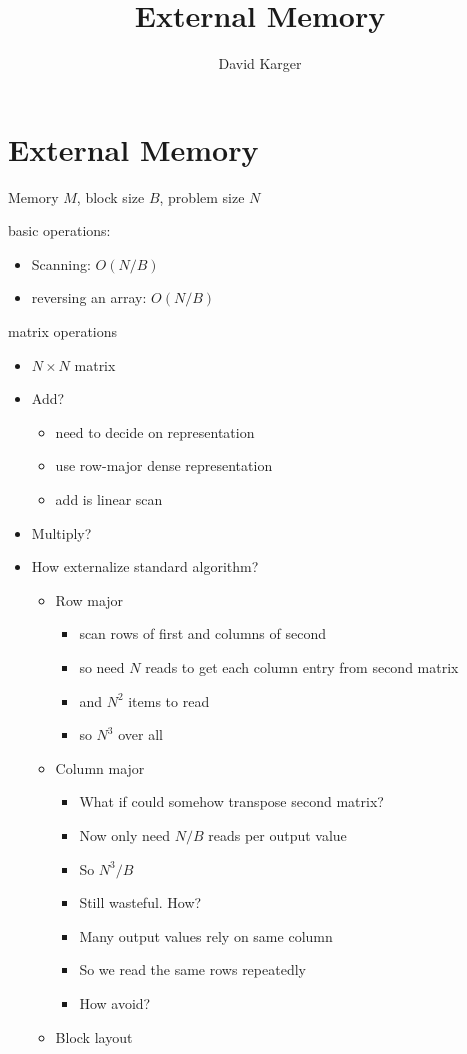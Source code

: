 \documentclass{article}
\title{External Memory}
\author{David Karger}
\begin{document}
\section*{External Memory}

Memory $M$, block size $B$, problem size $N$

basic operations:
\begin{itemize}
\item Scanning: $O(N/B)$
\item reversing an array: $O(N/B)$
\end{itemize}

matrix operations
\begin{itemize}
\item $N\times N$ matrix
\item Add?
\begin{itemize}
\item need to decide on representation
\item use row-major dense representation
\item add is linear scan
\end{itemize}
\item Multiply?
\item How externalize standard algorithm?
\begin{itemize}
\item Row major
\begin{itemize}
\item scan rows of first and columns of second
\item so need $N$ reads to get each column entry from second matrix
\item and $N^2$ items to read
\item so $N^3$ over all
\end{itemize}
\item Column major
\begin{itemize}
\item What if could somehow transpose second matrix?
\item Now only need $N/B$ reads per output value
\item So $N^3/B$
\item Still wasteful. How?
\item Many output values rely on same column
\item So we read the same rows repeatedly
\item How avoid?
\end{itemize}
\item Block layout
\begin{itemize}

\end{itemize}
\end{itemize}
\end{itemize}
\end{document}
